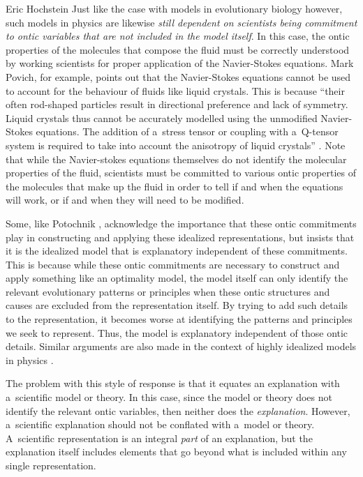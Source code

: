 \begin{artengenv}{Eric Hochstein}
Just like the case with models in evolutionary biology however, such models in physics are likewise \textit{still dependent on scientists being commitment to ontic variables that are not included in the model itself}. In this case, the ontic properties of the molecules that compose the fluid must be correctly understood by working scientists for proper application of the Navier-Stokes equations. Mark Povich, for example, points out that the Navier-Stokes equations cannot be used to account for the behaviour of fluids like liquid crystals. This is because ``their often rod-shaped particles result in directional preference and lack of symmetry. Liquid crystals thus cannot be accurately modelled using the unmodified Navier-Stokes equations. The addition of a~stress tensor or coupling with a~Q-tensor system is required to take into account the anisotropy of liquid crystals''
\parencite[][p.124]{povich_minimal_2018}. %
 Note that while the Navier-stokes equations themselves do not identify the molecular properties of the fluid, scientists must be committed to various ontic properties of the molecules that make up the fluid in order to tell if and when the equations will work, or if and when they will need to be modified.

Some, like Potochnik
\parencite*[][]{potochnik_explanatory_2010}, %
 acknowledge the importance that these ontic commitments play in constructing and applying these idealized representations, but insists that it is the idealized model that is explanatory independent of these commitments. This is because while these ontic commitments are necessary to construct and apply something like an optimality model, the model itself can only identify the relevant evolutionary patterns or principles when these ontic structures and causes are excluded from the representation itself. By trying to add such details to the representation, it becomes worse at identifying the patterns and principles we seek to represent. Thus, the model is explanatory independent of those ontic details. Similar arguments are also made in the context of highly idealized models in physics 
\parencites[see][]{batterman_devil_2002}[][]{batterman_minimal_2014}.%


The problem with this style of response is that it equates an explanation with a~scientific model or theory. In this case, since the model or theory does not identify the relevant ontic variables, then neither does the \textit{explanation}. However, a~scientific explanation should not be conflated with a~model or theory. A~scientific representation is an integral \textit{part} of an explanation, but the explanation itself includes elements that go beyond what is included within any single representation.


\end{artengenv}
